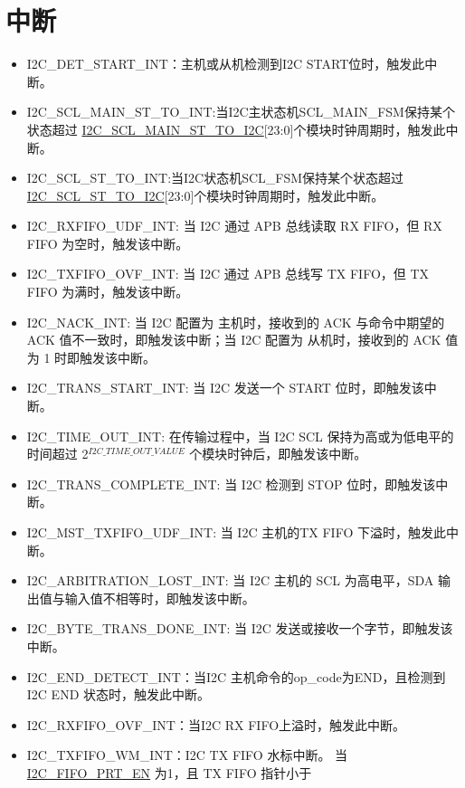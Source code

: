\documentclass[main\_\_CN.tex]{subfiles}
\begin{document}
\begin{enumerate}
\end{enumerate}

\section{中断}\label{sub:i2c-int}
\begin{itemize}
\item \label{int:i2c-start}I2C\_DET\_START\_INT：主机或从机检测到I2C START位时，触发此中断。
\item \label{int:i2c-scl-main-fsm}I2C\_SCL\_MAIN\_ST\_TO\_INT:当I2C主状态机SCL\_MAIN\_FSM保持某个状态超过 \hyperref[fielddesc:I2CSCLMAINSTTOI2C]{I2C\_SCL\_MAIN\_ST\_TO\_I2C}[23:0]个模块时钟周期时，触发此中断。
\item \label{int:i2c-scl-fsm}I2C\_SCL\_ST\_TO\_INT:当I2C状态机SCL\_FSM保持某个状态超过 \hyperref[fielddesc:I2CSCLSTTOI2C]{I2C\_SCL\_ST\_TO\_I2C}[23:0]个模块时钟周期时，触发此中断。
\item \label{int:i2c-rxfifo-udf}I2C\_RXFIFO\_UDF\_INT: 当 I2C 通过 APB 总线读取 RX FIFO，但 RX FIFO 为空时，触发该中断。
\item \label{int:i2c-txfifo-ovf}I2C\_TXFIFO\_OVF\_INT: 当 I2C 通过 APB 总线写 TX FIFO，但 TX FIFO 为满时，触发该中断。
\item \label{int:i2c-nack}I2C\_NACK\_INT: 当 I2C 配置为 主机时，接收到的 ACK 与命令中期望的 ACK 值不一致时，即触发该中断；当 I2C 配置为 从机时，接收到的 ACK 值为 1 时即触发该中断。
\item \label{int:i2c-trans-start}I2C\_TRANS\_START\_INT: 当 I2C 发送一个 START 位时，即触发该中断。
\item \label{int:i2c-time-out}I2C\_TIME\_OUT\_INT: 在传输过程中，当 I2C SCL 保持为高或为低电平的时间超过 2$^{\hyperref[fielddesc:I2CTIMEOUTVALUE]{I2C\_TIME\_OUT\_VALUE}}$ 个模块时钟后，即触发该中断。
\item \label{int:i2c-trans-complete}I2C\_TRANS\_COMPLETE\_INT: 当 I2C 检测到 STOP 位时，即触发该中断。
\item \label{int:i2c-mst-txfifo-udf}I2C\_MST\_TXFIFO\_UDF\_INT: 当 I2C 主机的TX FIFO 下溢时，触发此中断。
\item \label{int:i2c-arbitration-lost}I2C\_ARBITRATION\_LOST\_INT: 当 I2C 主机的 SCL 为高电平，SDA 输出值与输入值不相等时，即触发该中断。
\item \label{int:i2c-byte-trans-done}I2C\_BYTE\_TRANS\_DONE\_INT: 当 I2C 发送或接收一个字节，即触发该中断。
\item \label{int:i2c-end}I2C\_END\_DETECT\_INT：当I2C 主机命令的op\_code为END，且检测到 I2C END 状态时，触发此中断。
\item \label{int:i2c-rxfifo-ovf}I2C\_RXFIFO\_OVF\_INT：当I2C RX FIFO上溢时，触发此中断。
\item \label{int:i2c-txfifo-wm}I2C\_TXFIFO\_WM\_INT：I2C TX FIFO 水标中断。 当\hyperref[fielddesc:I2CFIFOPRTEN]{I2C\_FIFO\_PRT\_EN} 为1，且 TX FIFO 指针小于


\end{itemize}
\end{document}
